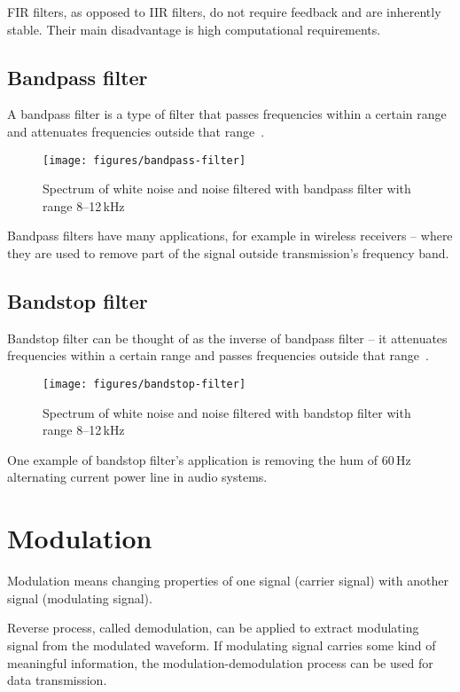 FIR filters, as opposed to IIR filters, do not require feedback and are inherently stable. Their main disadvantage is high computational requirements.

\subsection{Bandpass filter}

A bandpass filter is a type of filter that passes frequencies within a certain range and attenuates frequencies outside that range~\cite{JOSFilters}.

\begin{figure}[h]
  \centering
  \texttt{[image: figures/bandpass-filter]}
  \caption[Effect of a bandpass filter]{Spectrum of white noise and noise filtered with bandpass filter with range 8--12\,kHz}
  \label{fig:bandpass}
\end{figure}

Bandpass filters have many applications, for example in wireless receivers -- where they are used to remove part of the signal outside transmission's frequency band.

\subsection{Bandstop filter}

Bandstop filter can be thought of as the inverse of bandpass filter -- it attenuates frequencies within a certain range and passes frequencies outside that range~\cite{JOSFilters}.

\begin{figure}[h]
  \centering
  \texttt{[image: figures/bandstop-filter]}
  \caption[Effect of a bandstop filter]{Spectrum of white noise and noise filtered with bandstop filter with range 8--12\,kHz}
  \label{fig:bandstop}
\end{figure}

One example of bandstop filter's application is removing the hum of 60\,Hz alternating current power line in audio systems.

\section{Modulation}

Modulation means changing properties of one signal (carrier signal) with another signal (modulating signal).

Reverse process, called demodulation, can be applied to extract modulating signal from the modulated waveform.
If modulating signal carries some kind of meaningful information, the modulation-demodulation process can be used for data transmission.

